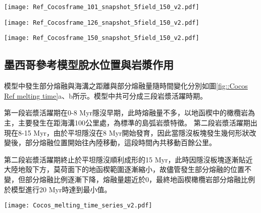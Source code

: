 \begin{figure*}[htp]
    \centering
    \texttt{[image: Ref\_Cocosframe\_101\_snapshot\_5field\_150\_v2.pdf]}
    \caption[墨西哥參考模型於20 Myr時之結果]{墨西哥參考模型於20 Myr時之結果。}
    \label{fig::Ref Cocos 101}
\end{figure*}

\begin{figure*}[htp]
    \centering
    \texttt{[image: Ref\_Cocosframe\_126\_snapshot\_5field\_150\_v2.pdf]}
    \caption[墨西哥參考模型於25 Myr時之結果]{墨西哥參考模型於25 Myr時之結果。}
    \label{fig::Ref Cocos 126}
\end{figure*}

\begin{figure*}[htp]
    \centering
    \texttt{[image: Ref\_Cocosframe\_150\_snapshot\_5field\_150\_v2.pdf]}
    \caption[墨西哥參考模型於30 Myr時之結果]{墨西哥參考模型於30 Myr時之結果。}
    \label{fig::Ref Cocos 150}
\end{figure*}

\newpage
\subsection{墨西哥參考模型脫水位置與岩漿作用}
模型中發生部分熔融與海溝之距離與部分熔融量隨時間變化分別如圖\ref{fig::Cocos Ref melting time}a、b所示。模型中共可分成三段岩漿活躍時期。

第一段岩漿活躍期在0-8 Myr隱沒早期，此時熔融量不多，以地函楔中的橄欖岩為主，主要發生在距海溝100公里處，為標準的島弧岩漿特徵。
第二段岩漿活躍期出現在8-15 Myr，由於平坦隱沒在8 Myr開始發育，因此當隱沒板塊發生幾何形狀改變後，部分熔融位置開始往內陸移動，這段時間內共移動百餘公里。

第二段岩漿活躍期終止於平坦隱沒順利成形的15 Myr，此時因隱沒板塊逐漸貼近大陸地殼下方，莫荷面下的地函楔範圍逐漸縮小，故儘管發生部分熔融的位置不變，但部分熔融比例逐漸下降，熔融量趨近於0，最終地函楔橄欖岩部分熔融比例於模型進行20 Myr時達到最小值。
\begin{figure*}[h]
    \centering
    \texttt{[image: Cocos\_melting\_time\_series\_v2.pdf]}
    \caption[墨西哥參考模型岩漿作用隨時間變化]{墨西哥參考模型岩漿作用隨時間變化，灰色底標出平坦隱沒發育後時間段。(a)部分熔融與海溝之距離隨時間變化圖，縱軸中每個點代表每次部分熔融發生位置，顏色為指數上的部分熔融比例。(b)岩石熔融量隨時間變化圖，熔融量單位為每單位海溝產生之立方公里量中每20萬年瞬時量。顏色代表不同岩相。}
    \label{fig::Cocos Ref melting time}
\end{figure*}

